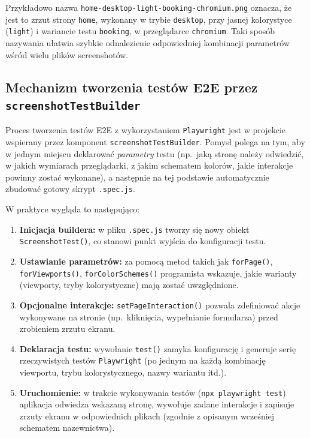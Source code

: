 \documentclass[12pt]{report}
\begin{document}
Przykładowo nazwa \texttt{home-desktop-light-booking-chromium.png} oznacza, że jest to zrzut strony \texttt{home}, wykonany w trybie \texttt{desktop}, przy jasnej kolorystyce (\texttt{light}) i wariancie testu \texttt{booking}, w przeglądarce \texttt{chromium}. Taki sposób nazywania ułatwia szybkie odnalezienie odpowiedniej kombinacji parametrów wśród wielu plików screenshotów.

\subsection{Mechanizm tworzenia testów E2E przez \texttt{screenshotTestBuilder}}
\label{sec:mechanizm-builder}

Proces tworzenia testów E2E z wykorzystaniem \texttt{Playwright} jest w projekcie wspierany przez komponent \texttt{screenshotTestBuilder}. Pomysł polega na tym, aby w jednym miejscu deklarować \emph{parametry} testu (np.~jaką stronę należy odwiedzić, w jakich wymiarach przeglądarki, z jakim schematem kolorów, jakie interakcje powinny zostać wykonane), a następnie na tej podstawie automatycznie zbudować gotowy skrypt \texttt{.spec.js}.

W praktyce wygląda to następująco:
\begin{enumerate}
    \item \textbf{Inicjacja buildera:} w pliku \texttt{.spec.js} tworzy się nowy obiekt \texttt{ScreenshotTest()}, co stanowi punkt wyjścia do konfiguracji testu.
    \item \textbf{Ustawianie parametrów:} za pomocą metod takich jak \texttt{forPage()}, \texttt{forViewports()}, \texttt{forColorSchemes()} programista wskazuje, jakie warianty (viewporty, tryby kolorystyczne) mają zostać uwzględnione.
    \item \textbf{Opcjonalne interakcje:} \texttt{setPageInteraction()} pozwala zdefiniować akcje wykonywane na stronie (np.~kliknięcia, wypełnianie formularza) przed zrobieniem zrzutu ekranu.
    \item \textbf{Deklaracja testu:} wywołanie \texttt{test()} zamyka konfigurację i generuje serię rzeczywistych testów \texttt{Playwright} (po jednym na każdą kombinację viewportu, trybu kolorystycznego, nazwy wariantu itd.).
    \item \textbf{Uruchomienie:} w trakcie wykonywania testów (\texttt{npx playwright test}) aplikacja odwiedza wskazaną stronę, wywołuje zadane interakcje i zapisuje zrzuty ekranu w odpowiednich plikach (zgodnie z opisanym wcześniej schematem nazewnictwa).
\end{enumerate}
\end{document}
